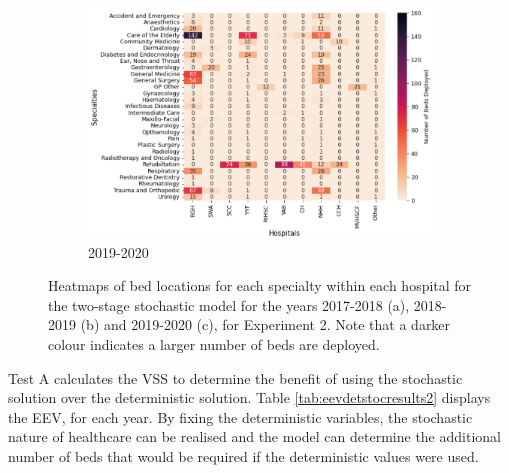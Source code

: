 \documentclass[../thesis.tex]{subfiles}
\begin{document}
\begin{figure}\ContinuedFloat
     \begin{subfigure}[h!]{0.8\textwidth}
         \centering
         \includegraphics[width=\textwidth]{Chapters/Chapter5/Figuresnew/20stoc.png}
         \caption{2019-2020}
         \label{fig:stocexp2c}
     \end{subfigure}
        \caption{Heatmaps of bed locations for each specialty within each hospital for the two-stage stochastic model for the years 2017-2018 (a), 2018-2019 (b) and 2019-2020 (c), for Experiment 2. Note that a darker colour indicates a larger number of beds are deployed.}
        \label{fig:stocexp2}
\end{figure}

\FloatBarrier


Test A calculates the VSS to determine the benefit of using the stochastic solution over the deterministic solution. Table \ref{tab:eevdetstocresults2} displays the EEV, for each year. By fixing the deterministic variables, the stochastic nature of healthcare can be realised and the model can determine the additional number of beds that would be required if the deterministic values were used.
\end{document}
